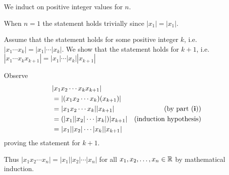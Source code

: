 \begin{questions}
\begin{partquestions}{\roman*}
        \item We induct on positive integer values for $n$.

        When $n = 1$ the statement holds trivially since $|x_1| = |x_1|$.

        Assume that the statement holds for some positive integer $k$, i.e. $|x_1\cdots x_k| = |x_1|\cdots|x_k|$. We show that the statement holds for $k+1$, i.e. $|x_1\cdots x_kx_{k+1}| = |x_1|\cdots|x_k||x_{k+1}|$

        Observe
        \begin{align*}
            &|x_1x_2\cdots x_kx_{k+1}|\\
            &= |(x_1x_2\cdots x_k)(x_{k+1})|\\
            &= |x_1x_2\cdots x_k||x_{k+1}| & (\text{by part (\textbf{i})})\\
            &= (|x_1||x_2|\cdots|x_k|)|x_{k+1}| & (\text{induction hypothesis})\\
            &= |x_1||x_2|\cdots|x_k||x_{k+1}|
        \end{align*}
        proving the statement for $k + 1$.

        Thus $|x_1x_2\cdots x_n| = |x_1||x_2|\cdots|x_n|$ for all $x_1, x_2, \dots, x_n \in \mathbb{R}$ by mathematical induction.
    \end{partquestions}
\end{questions}
